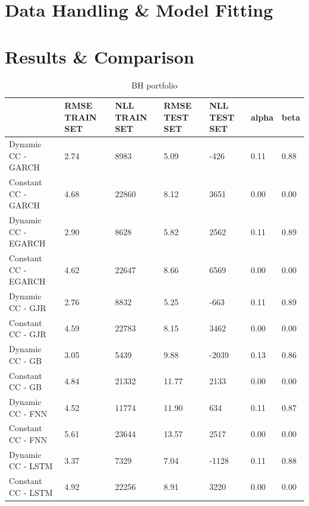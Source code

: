 \documentclass[a4paper, oneside]{discothesis}
\begin{document}
\section{Data Handling \& Model Fitting}
\section{Results \& Comparison}
\begin{table}[!ht]
    \scriptsize
    \centering
    \begin{tabular}{|p{3.5cm}||p{1.1cm}|p{1.1cm}|p{1.1cm}|p{1.1cm}|p{1.1cm}|p{1.1cm}|}
    \hline
         & RMSE TRAIN SET & NLL TRAIN SET & RMSE TEST SET & NLL TEST SET & alpha & beta \\ \hline \hline
        Dynamic CC - GARCH & 2.74 & 8983 & 5.09 & -426 & 0.11 & 0.88 \\ \hline
        Constant CC - GARCH & 4.68 & 22860 & 8.12 & 3651 & 0.00 & 0.00 \\ \hline
        Dynamic CC - EGARCH & 2.90 & 8628 & 5.82 & 2562 & 0.11 & 0.89 \\ \hline
        Constant CC - EGARCH & 4.62 & 22647 & 8.66 & 6569 & 0.00 & 0.00 \\ \hline
        Dynamic CC - GJR & 2.76 & 8832 & 5.25 & -663 & 0.11 & 0.89 \\ \hline
        Constant CC - GJR & 4.59 & 22783 & 8.15 & 3462 & 0.00 & 0.00 \\ \hline
        Dynamic CC - GB & 3.05 & 5439 & 9.88 & -2039 & 0.13 & 0.86 \\ \hline
        Constant CC - GB & 4.84 & 21332 & 11.77 & 2133 & 0.00 & 0.00 \\ \hline
        Dynamic CC - FNN & 4.52 & 11774 & 11.90 & 634 & 0.11 & 0.87 \\ \hline
        Constant CC - FNN & 5.61 & 23644 & 13.57 & 2517 & 0.00 & 0.00 \\ \hline
        Dynamic CC - LSTM & 3.37 & 7329 & 7.04 & -1128 & 0.11 & 0.88 \\ \hline
        Constant CC - LSTM & 4.92 & 22256 & 8.91 & 3220 & 0.00 & 0.00 \\ \hline
    \end{tabular}
    \normalsize
    \caption{BH portfolio}
\end{table}
\end{document}
